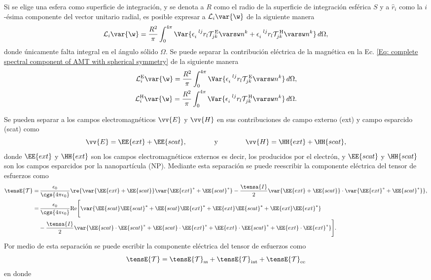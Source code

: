 Si se elige una esfera como superficie de integración, y se denota a $R$ como el radio de la superficie de integración esférica $S$ y a $\hat{r}_i$ como la $i$-ésima componente del vector unitario radial, es posible expresar a $\mathcal{L}_i \var{\w}$ de la siguiente manera
\begin{equation}
\mathcal{L}_i\var{\w} = \frac{R^2}{\pi} \int_0^{4\pi} \Var{\epsilon_{i}^{\,\,\,\, lj} r_l \mathcal{T}^{\, \rm E}_{jk}\varsw n^k + \epsilon_{i}^{\,\,\,\, lj} r_l \mathcal{T}^{\, \rm H}_{jk}\varsw n^k}\,d\Omega,
\label{Eq: complete spectral component of AMT with spherical symmetry}
\end{equation}
donde únicamente falta integral en el ángulo sólido $\Omega$. Se puede separar la contribución eléctrica de la magnética en la Ec. \eqref{Eq: complete spectral component of AMT with spherical symmetry} de la siguiente manera
\begin{align}
\mathcal{L}_i^{\rm E}\var{\w} = \frac{R^2}{\pi} \int_0^{4\pi} \Var{\epsilon_{i}^{\,\,\,\, lj} r_l \mathcal{T}^{\,\rm E}_{jk}\varsw n^k}\,d\Omega, \\
\mathcal{L}_i^{\rm H}\var{\w} = \frac{R^2}{\pi} \int_0^{4\pi} \Var{\epsilon_{i}^{\,\,\,\, lj} r_l \mathcal{T}^{\,\rm H}_{jk}\varsw n^k}\,d\Omega.
\end{align}

Se pueden separar a los campos electromagnéticos $\vv{E}$ y $\vv{H}$ en sus contribuciones de campo externo (ext) y campo esparcido (scat) como 
\begin{equation}
\vv{E} = \EE{ext} + \EE{scat}, \qquad\qquad \text{y} \qquad\qquad \vv{H} = \HH{ext} + \HH{scat},
\end{equation}
donde $\EE{ext}$ y $\HH{ext}$ son los campos electromagnéticos externos \textemdash es decir, los producidos por el electrón\textemdash, y $\EE{scat}$ y $\HH{scat}$ son los campos esparcidos por la nanopartícula (NP). Mediante esta separación se puede reescribir la componente eléctrica del tensor de esfuerzos como
\begin{align}
\tensE{\mathcal{T}}=&\,\frac{\epsilon_0}{\cgs{4\pi\epsilon_0}} \re{ \var{\EE{ext}+\EE{scat}}\var{\EE{ext}^{*}+\EE{scat}^{*}}-\frac{\tensa{I}}{2}\var{\EE{ext}+\EE{scat}}\cdot\var{\EE{ext}^{*}+\EE{scat}^{*}} },\nonumber \\
=& \, \frac{\epsilon_0}{\cgs{4\pi\epsilon_0}} {\rm Re} \Bigg[\var{\EE{scat}\EE{scat}^{*}+\EE{scat}\EE{ext}^{*}+\EE{ext}\EE{scat}^{*}+\EE{ext}\EE{ext}^{*}}\nonumber \\
&-\frac{\tensa{I}}{2}\var{\EE{scat}\cdot\EE{scat}^{*}+\EE{scat}\cdot\EE{ext}^{*}+\EE{ext}\cdot\EE{scat}^{*}+\EE{ext}\cdot\EE{ext}^{*}} \Bigg].
\label{eq: tensor de esfuerzos inicio}
\end{align}
Por medio de esta separación se puede escribir la componente eléctrica del tensor de esfuerzos como
\begin{equation}
\tensE{\mathcal{T}}=\tensE{\mathcal{T}}_{\rm ss}+\tensE{\mathcal{T}}_{\rm int}+\tensE{\mathcal{T}}_{\rm ee}
\end{equation}
en donde

